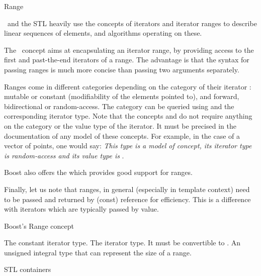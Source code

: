 \begin{ccRefConcept}{Range}

\ccDefinition

\cgal\ and the STL heavily use the concepts of iterators and iterator ranges
to describe linear sequences of elements, and algorithms operating on these.

The \ccRefName\ concept aims at encapsulating an iterator range, by providing
access to the first and past-the-end iterators of a range.  The advantage is
that the syntax for passing ranges is much more concise than passing two
arguments separately.


Ranges come in different categories depending on the category of their iterator :
mutable or constant (modifiability of the elements pointed to), and forward,
bidirectional or random-access.  The category can be queried using
 and the corresponding iterator type.  Note that
the concepts  and  do not require anything on
the category or the value type of the iterator. It must be precised in the
documentation of any model of these concepts. For example, in the case of a vector of points, one would say:
\textit{This type is a model of  concept, its iterator type is random-access
and its value type is }.

Boost also offers the
which provides good support for ranges.

Finally, let us note that ranges, in general (especially in template context)
need to be passed and returned by (const) reference for efficiency.  This is a
difference with iterators which are typically passed by value.

\ccRefines


Boost's Range concept

{}  %

\ccTypes

 {The constant iterator type.}
 {The iterator type.  It must be convertible to .}
 {An unsigned integral type that can represent the
  size of a range.} 


\def\ccTagRmTrailingConst{\ccFalse}

\ccGlue
{}
\ccGlue
{}
\ccGlue
{}

\ccGlue
{}

\def\ccTagRmTrailingConst{\ccTrue}

\ccHasModels
STL containers

\end{ccRefConcept}

